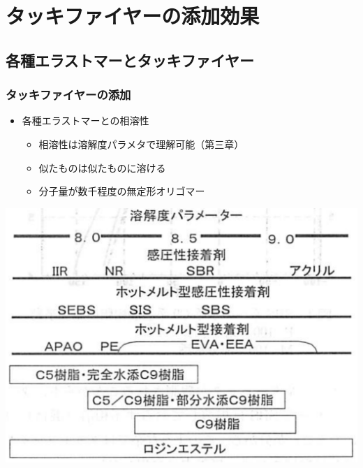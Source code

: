 \documentclass[unicode,12pt]{beamer}%
\begin{document}
\section{タッキファイヤーの添加効果}

\subsection{各種エラストマーとタッキファイヤー}
\begin{frame}
	\frametitle{タッキファイヤーの添加}
	\begin{itemize}
		\item 各種エラストマーとの相溶性
		\begin{itemize}
			\item 相溶性は溶解度パラメタで理解可能（第三章）
			\item 似たものは似たものに溶ける
			\item \alert{分子量が数千程度}の無定形オリゴマー
		\end{itemize}
	\end{itemize}
	\vspace{3mm}
				\centering
					\includegraphics[width=.6\textwidth]{souyousei.png}
\end{frame}
\end{document}
